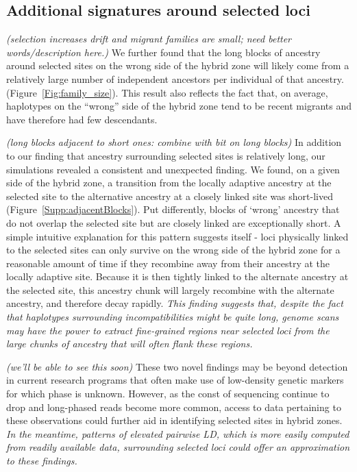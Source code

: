 \documentclass[11pt,letterpaper]{article}
\newcommand{\alisa}[1]{{\em \color{red} #1}}
\newcommand{\plr}[1]{{\em \color{blue} #1}}
\newcommand{\yb}[1]{{\em \color{magenta} #1}}
\begin{document}
\subsection*{Additional signatures around selected loci} 

\plr{(selection increases drift and migrant families are small; need better words/description here.)}
We further found that the long blocks of ancestry around selected sites on the wrong side of the hybrid zone will likely come from a relatively large number of independent ancestors per individual of that ancestry. (Figure~\ref{Fig:family_size}). %
This result also reflects the fact that, on average, haplotypes on the ``wrong'' side of the hybrid zone tend to be recent migrants and have therefore had few descendants. 

\plr{(long blocks adjacent to short ones: combine with bit on long blocks)}
In addition to our finding that ancestry surrounding selected sites is relatively long, our simulations revealed a consistent and unexpected finding. We found, on a given side of the hybrid zone, a transition from the locally adaptive ancestry at the selected site to the alternative ancestry at a closely linked site was short-lived (Figure~\ref{Supp:adjacentBlocks}). Put differently, blocks of `wrong' ancestry that do not overlap the selected site but are closely linked are exceptionally short. A simple intuitive explanation for this pattern suggests itself - loci physically linked to the selected sites can only survive on the wrong side of the hybrid zone for a reasonable amount of time if they recombine away from their ancestry at the locally adaptive site. Because it is then tightly linked to the alternate ancestry at the selected site, this ancestry chunk will largely recombine with the alternate ancestry, and therefore decay rapidly. \yb{This finding suggests that, despite the fact that haplotypes surrounding incompatibilities might be quite long, genome scans may have the power to extract fine-grained regions near selected loci from the large chunks of ancestry that will often flank these regions.}

\plr{(we'll be able to see this soon)}
These two novel findings may be beyond detection in current research programs that often make use of low-density genetic markers for which phase is unknown. However, as the const of sequencing continue to drop and long-phased reads become more common, access to data pertaining to these observations could further aid in identifying selected sites in hybrid zones.  %
\alisa{In the meantime, patterns of elevated pairwise LD, which is more easily computed from readily available data, surrounding selected loci could offer an approximation to these findings.}
\end{document}
